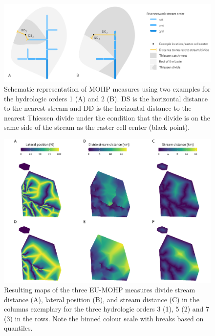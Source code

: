\documentclass[fleqn,10pt]{wlscirep}
\begin{document}
\normalsize

\small

\begin{figure}[H]

{\centering \includegraphics[width=1\linewidth]{data_descriptor/tex/mohp_scheme} 

}

\caption{Schematic representation of MOHP measures using two examples for the hydrologic orders 1 (A) and 2 (B). DS is the horizontal distance to the nearest stream and DD is the horizontal distance to the nearest Thiessen divide under the condition that the divide is on the same side of the stream as the raster cell center (black point).}\label{fig:schematicmohp}
\end{figure}

\normalsize

\small

\begin{figure}[H]

{\centering \includegraphics[width=1\linewidth]{data_descriptor/tex/figure-datasetmapoverviewplot-1} 

}

\caption{Resulting maps of the three EU-MOHP measures divide stream distance (A), lateral position (B),  and stream distance (C) in the columns exemplary for the three hydrologic orders 3 (1), 5 (2) and 7 (3) in the rows. Note the binned colour scale with breaks based on quantiles.}\label{fig:datasetmapoverviewplot}
\end{figure}
\end{document}
